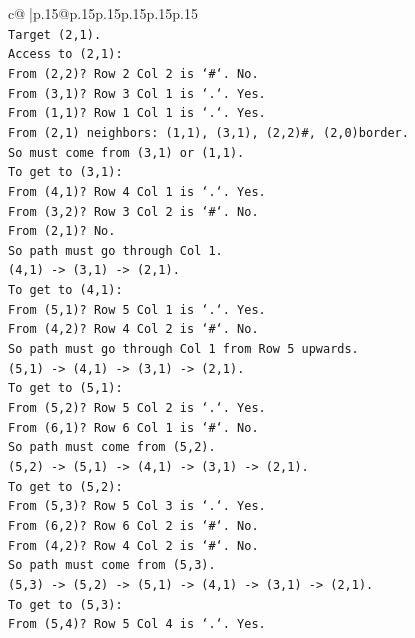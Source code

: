 \documentclass{article}
\begin{document}
{\begin{supertabular}{c@{$\;$}|p{.15\linewidth}@{}p{.15\linewidth}p{.15\linewidth}p{.15\linewidth}p{.15\linewidth}p{.15\linewidth}}
{{{\\ 
\texttt{Target (2,1).} \\
\texttt{Access to (2,1):} \\
\texttt{From (2,2)? Row 2 Col 2 is `\#`. No.} \\
\texttt{From (3,1)? Row 3 Col 1 is `.`. Yes.} \\
\texttt{From (1,1)? Row 1 Col 1 is `.`. Yes.} \\
\texttt{From (2,1) neighbors: (1,1), (3,1), (2,2)\#, (2,0)border.} \\
\texttt{So must come from (3,1) or (1,1).} \\
\texttt{To get to (3,1):} \\
\texttt{From (4,1)? Row 4 Col 1 is `.`. Yes.} \\
\texttt{From (3,2)? Row 3 Col 2 is `\#`. No.} \\
\texttt{From (2,1)? No.} \\
\texttt{So path must go through Col 1.} \\
\texttt{(4,1) {-}> (3,1) {-}> (2,1).} \\
\texttt{To get to (4,1):} \\
\texttt{From (5,1)? Row 5 Col 1 is `.`. Yes.} \\
\texttt{From (4,2)? Row 4 Col 2 is `\#`. No.} \\
\texttt{So path must go through Col 1 from Row 5 upwards.} \\
\texttt{(5,1) {-}> (4,1) {-}> (3,1) {-}> (2,1).} \\
\texttt{To get to (5,1):} \\
\texttt{From (5,2)? Row 5 Col 2 is `.`. Yes.} \\
\texttt{From (6,1)? Row 6 Col 1 is `\#`. No.} \\
\texttt{So path must come from (5,2).} \\
\texttt{(5,2) {-}> (5,1) {-}> (4,1) {-}> (3,1) {-}> (2,1).} \\
\texttt{To get to (5,2):} \\
\texttt{From (5,3)? Row 5 Col 3 is `.`. Yes.} \\
\texttt{From (6,2)? Row 6 Col 2 is `\#`. No.} \\
\texttt{From (4,2)? Row 4 Col 2 is `\#`. No.} \\
\texttt{So path must come from (5,3).} \\
\texttt{(5,3) {-}> (5,2) {-}> (5,1) {-}> (4,1) {-}> (3,1) {-}> (2,1).} \\
\texttt{To get to (5,3):} \\
\texttt{From (5,4)? Row 5 Col 4 is `.`. Yes.} \\
}}}
\end{supertabular}}
\end{document}
